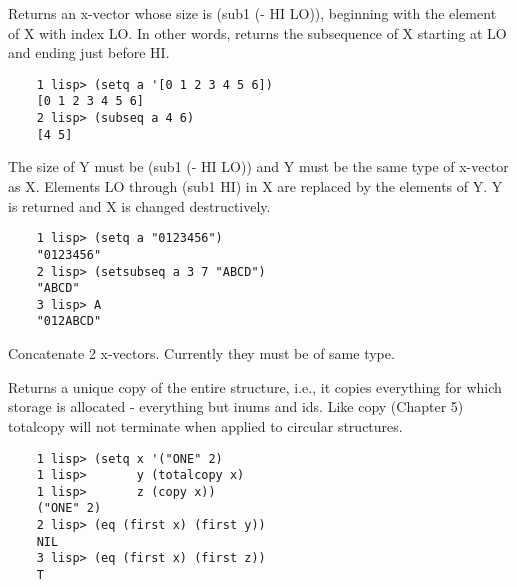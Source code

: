 {    Returns  an  x-vector  whose  size  is  (sub1  (-  HI  LO)),
    beginning  with  the  element  of X with index LO.  In other
    words, returns the subsequence  of  X  starting  at  LO  and
    ending just before HI.
}
\begin{verbatim}
    1 lisp> (setq a '[0 1 2 3 4 5 6])
    [0 1 2 3 4 5 6]
    2 lisp> (subseq a 4 6)
    [4 5]
\end{verbatim}

{                                                  
    The  size  of  Y  must be (sub1 (- HI LO)) and Y must be the
    same type of x-vector as X.  Elements LO through  (sub1  HI)
    in X are replaced by the elements of Y.  Y is returned and X
    is changed destructively.
}

\begin{verbatim}
    1 lisp> (setq a "0123456")
    "0123456"
    2 lisp> (setsubseq a 3 7 "ABCD")
    "ABCD"
    3 lisp> A
    "012ABCD"
\end{verbatim}

{    Concatenate  2  x-vectors.    Currently they must be of same
    type.
}

{    Returns a unique copy of  the  entire  structure,  i.e.,  it
    copies   everything   for   which  storage  is  allocated  -
    everything but  inums  and  ids.    Like  copy  (Chapter  5)
    totalcopy  will  not  terminate  when  applied  to  circular
    structures.
}
\begin{verbatim}
    1 lisp> (setq x '("ONE" 2)
    1 lisp>       y (totalcopy x)
    1 lisp>       z (copy x))
    ("ONE" 2)
    2 lisp> (eq (first x) (first y))
    NIL
    3 lisp> (eq (first x) (first z))
    T
\end{verbatim}
